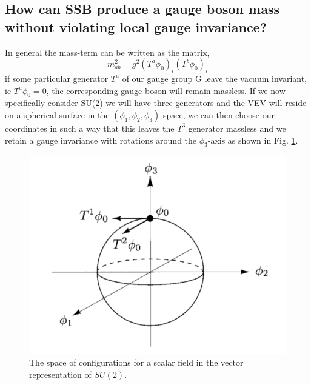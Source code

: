 \documentclass[paper=a4, fontsize=11pt]{scrartcl} %
\numberwithin{equation}{section} %
\numberwithin{figure}{section} %
\numberwithin{table}{section} %
\begin{document}
\subsection*{How can SSB produce a gauge boson mass without violating local gauge invariance?}
In general the mass-term can be written as the matrix,
\begin{equation}
m^2_{ab} = g^2(T^a\phi_0)_i(T^b \phi_0)_i
\end{equation}
if some particular generator $T^a$ of our gauge group G leave the vacuum invariant, ie $T^a\phi_0 = 0$, the corresponding gauge boson will remain massless.
If we now specifically consider SU(2) we will have three generators and the VEV will reside on a spherical surface in the $(\phi_1, \phi_2, \phi_3)$-space, we can then choose our coordinates in such a way that this leaves the $T^3$ generator massless and we retain a gauge invariance with rotations around the $\phi_3$-axis as shown in Fig. \ref{fig:SSB_SU2}.

\begin{figure}[hbtp]
\centering
\includegraphics[width=\textwidth]{SSB_SU2.png}
\caption{The space of configurations for a scalar field in the vector representation of $SU(2)$.}
\label{fig:SSB_SU2}
\end{figure}
\end{document}
